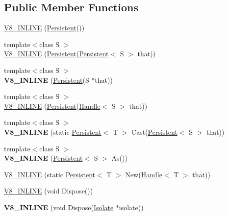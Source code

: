 \subsection*{Public Member Functions}
\begin{DoxyCompactItemize}
\item 
\hyperlink{classv8_1_1_persistent_ad523a6fc8bf2490020009436519423d0}{V8\+\_\+\+I\+N\+L\+I\+N\+E} (\hyperlink{classv8_1_1_persistent}{Persistent}())
\item 
{\footnotesize template$<$class S $>$ }\\\hyperlink{classv8_1_1_persistent_a22ac4d575e808ed10b6504dc8f812789}{V8\+\_\+\+I\+N\+L\+I\+N\+E} (\hyperlink{classv8_1_1_persistent}{Persistent}(\hyperlink{classv8_1_1_persistent}{Persistent}$<$ S $>$ that))
\item 
\hypertarget{classv8_1_1_persistent_a59285008a6fcdd9a5189015403375b4e}{}{\footnotesize template$<$class S $>$ }\\{\bfseries V8\+\_\+\+I\+N\+L\+I\+N\+E} (\hyperlink{classv8_1_1_persistent}{Persistent}(S $\ast$that))\label{classv8_1_1_persistent_a59285008a6fcdd9a5189015403375b4e}

\item 
{\footnotesize template$<$class S $>$ }\\\hyperlink{classv8_1_1_persistent_aabe20913d6860e124574bc4d67535a5c}{V8\+\_\+\+I\+N\+L\+I\+N\+E} (\hyperlink{classv8_1_1_persistent}{Persistent}(\hyperlink{classv8_1_1_handle}{Handle}$<$ S $>$ that))
\item 
\hypertarget{classv8_1_1_persistent_acd5e8f1e94848aff791b9bdf0f1fed90}{}{\footnotesize template$<$class S $>$ }\\{\bfseries V8\+\_\+\+I\+N\+L\+I\+N\+E} (static \hyperlink{classv8_1_1_persistent}{Persistent}$<$ T $>$ Cast(\hyperlink{classv8_1_1_persistent}{Persistent}$<$ S $>$ that))\label{classv8_1_1_persistent_acd5e8f1e94848aff791b9bdf0f1fed90}

\item 
\hypertarget{classv8_1_1_persistent_a092bc149b5515c88e5950717e90eed9f}{}{\footnotesize template$<$class S $>$ }\\{\bfseries V8\+\_\+\+I\+N\+L\+I\+N\+E} (\hyperlink{classv8_1_1_persistent}{Persistent}$<$ S $>$ As())\label{classv8_1_1_persistent_a092bc149b5515c88e5950717e90eed9f}

\item 
\hyperlink{classv8_1_1_persistent_a6f6e0d5627191c9e45f4cb63ef8b805d}{V8\+\_\+\+I\+N\+L\+I\+N\+E} (static \hyperlink{classv8_1_1_persistent}{Persistent}$<$ T $>$ New(\hyperlink{classv8_1_1_handle}{Handle}$<$ T $>$ that))
\item 
\hyperlink{classv8_1_1_persistent_adae44eb24d3c568f9ab948d3efd3dbfa}{V8\+\_\+\+I\+N\+L\+I\+N\+E} (void Dispose())
\item 
\hypertarget{classv8_1_1_persistent_aa0f3928a4dd02a35d174299346673846}{}{\bfseries V8\+\_\+\+I\+N\+L\+I\+N\+E} (void Dispose(\hyperlink{classv8_1_1_isolate}{Isolate} $\ast$isolate))\label{classv8_1_1_persistent_aa0f3928a4dd02a35d174299346673846}


\end{DoxyCompactItemize}
